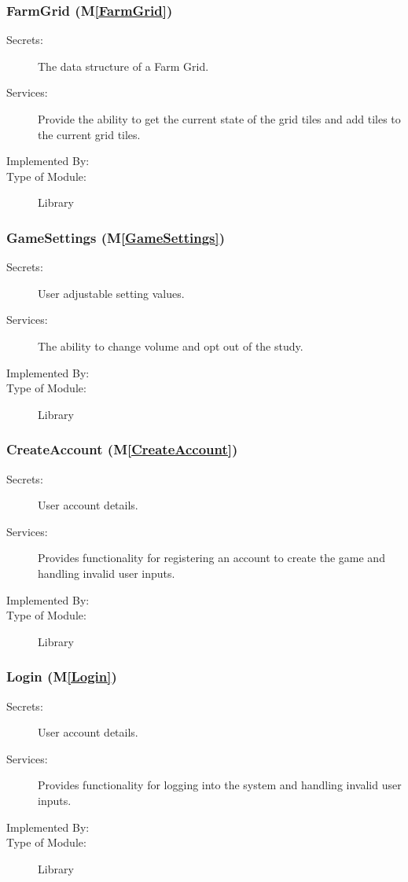 \documentclass[12pt, titlepage]{article}
\newcommand{\mref}[1]{M\ref{#1}}
\begin{document}
\subsubsection{FarmGrid (\mref{FarmGrid})}

\begin{description}
\item[Secrets:] The data structure of a Farm Grid.
\item[Services:] Provide the ability to get the current state of the grid tiles and add tiles to the current grid tiles.
\item[Implemented By:]  \progname
\item[Type of Module:] Library
\end{description}

\subsubsection{GameSettings (\mref{GameSettings})}

\begin{description}
\item[Secrets:] User adjustable setting values.
\item[Services:] The ability to change volume and opt out of the study.
\item[Implemented By:]  \progname
\item[Type of Module:] Library
\end{description}

\subsubsection{CreateAccount (\mref{CreateAccount})}

\begin{description}
\item[Secrets:] User account details.
\item[Services:] Provides functionality for registering an account to create the game and handling invalid user inputs.
\item[Implemented By:]  \progname
\item[Type of Module:] Library
\end{description}

\subsubsection{Login (\mref{Login})}

\begin{description}
\item[Secrets:] User account details.
\item[Services:] Provides functionality for logging into the system and handling invalid user inputs.
\item[Implemented By:]  \progname
\item[Type of Module:] Library
\end{description}
\end{document}
